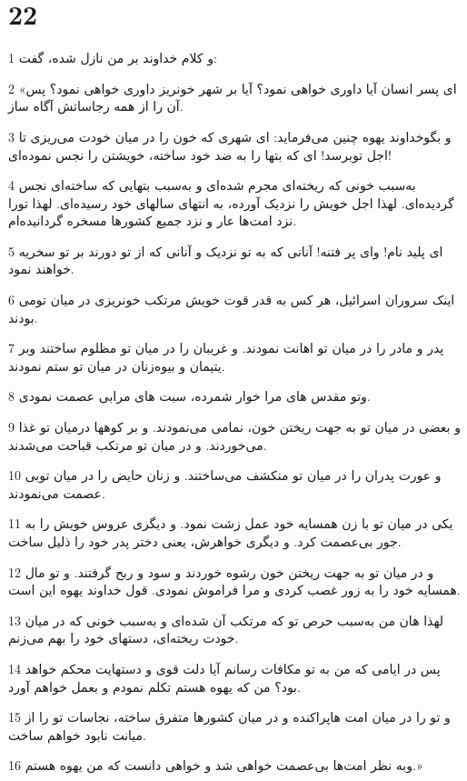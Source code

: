 \chapter{22}

\par 1 و کلام خداوند بر من نازل شده، گفت:
\par 2 «ای پسر انسان آیا داوری خواهی نمود؟ آیا بر شهر خونریز داوری خواهی نمود؟ پس آن را از همه رجاساتش آگاه ساز.
\par 3 و بگوخداوند یهوه چنین می‌فرماید: ای شهری که خون را در میان خودت می‌ریزی تا اجل توبرسد! ای که بتها را به ضد خود ساخته، خویشتن را نجس نموده‌ای!
\par 4 به‌سبب خونی که ریخته‌ای مجرم شده‌ای و به‌سبب بتهایی که ساخته‌ای نجس گردیده‌ای. لهذا اجل خویش را نزدیک آورده، به انتهای سالهای خود رسیده‌ای. لهذا تورا نزد امت‌ها عار و نزد جمیع کشورها مسخره گردانیده‌ام.
\par 5 ‌ای پلید نام! و‌ای پر فتنه! آنانی که به تو نزدیک و آنانی که از تو دورند بر تو سخریه خواهند نمود.
\par 6 اینک سروران اسرائیل، هر کس به قدر قوت خویش مرتکب خونریزی در میان تومی بودند.
\par 7 پدر و مادر را در میان تو اهانت نمودند. و غریبان را در میان تو مظلوم ساختند وبر یتیمان و بیوه‌زنان در میان تو ستم نمودند.
\par 8 وتو مقدس های مرا خوار شمرده، سبت های مرابی عصمت نمودی.
\par 9 و بعضی در میان تو به جهت ریختن خون، نمامی می‌نمودند. و بر کوهها درمیان تو غذا می‌خوردند. و در میان تو مرتکب قباحت می‌شدند.
\par 10 و عورت پدران را در میان تو منکشف می‌ساختند. و زنان حایض را در میان توبی عصمت می‌نمودند.
\par 11 یکی در میان تو با زن همسایه خود عمل زشت نمود. و دیگری عروس خویش را به جور بی‌عصمت کرد. و دیگری خواهرش، یعنی دختر پدر خود را ذلیل ساخت.
\par 12 و در میان تو به جهت ریختن خون رشوه خوردند و سود و ربح گرفتند. و تو مال همسایه خود را به زور غصب کردی و مرا فراموش نمودی. قول خداوند یهوه این است.
\par 13 لهذا هان من به‌سبب حرص تو که مرتکب آن شده‌ای و به‌سبب خونی که در میان خودت ریخته‌ای، دستهای خود را بهم می‌زنم.
\par 14 پس در ایامی که من به تو مکافات رسانم آیا دلت قوی و دستهایت محکم خواهد بود؟ من که یهوه هستم تکلم نمودم و بعمل خواهم آورد.
\par 15 و تو را در میان امت هاپراکنده و در میان کشورها متفرق ساخته، نجاسات تو را از میانت نابود خواهم ساخت.
\par 16 وبه نظر امت‌ها بی‌عصمت خواهی شد و خواهی دانست که من یهوه هستم.»
